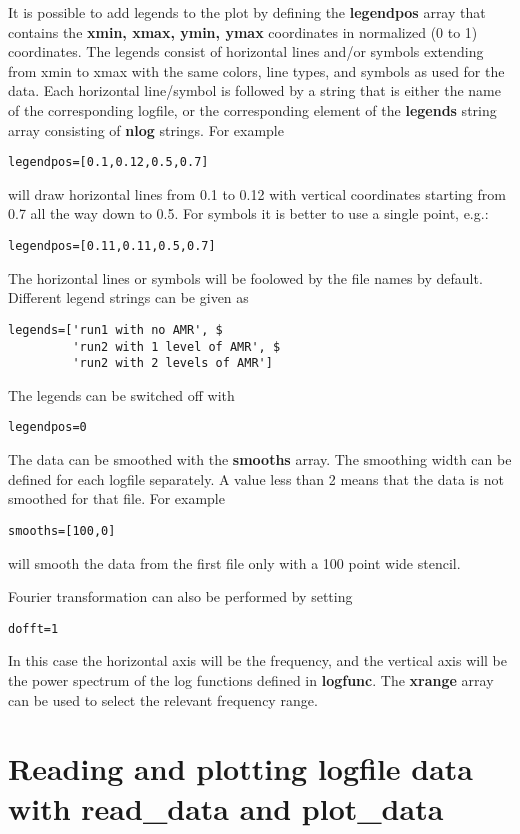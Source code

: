 \documentclass{article}
\begin{document}
It is possible to add legends to the plot by defining the {\bf legendpos}
array that contains the {\bf xmin, xmax, ymin, ymax} coordinates 
in normalized (0 to 1) coordinates. The legends consist of 
horizontal lines and/or symbols extending from xmin to xmax with the 
same colors, line types, and symbols as used for the data. 
Each horizontal line/symbol is followed by a string that is either
the name of the corresponding logfile, or the corresponding
element of the {\bf legends} string array consisting of {\bf nlog} strings.
For example
\begin{verbatim}
legendpos=[0.1,0.12,0.5,0.7]
\end{verbatim}
will draw horizontal lines from 0.1 to 0.12 with vertical coordinates
starting from 0.7 all the way down to 0.5. For symbols it is better
to use a single point, e.g.:
\begin{verbatim}
legendpos=[0.11,0.11,0.5,0.7]
\end{verbatim}
The horizontal lines or symbols will be foolowed by the file names by default.
Different legend strings can be given as
\begin{verbatim}
legends=['run1 with no AMR', $
         'run2 with 1 level of AMR', $
         'run2 with 2 levels of AMR']
\end{verbatim}
The legends can be switched off with 
\begin{verbatim}
legendpos=0
\end{verbatim}
The data can be smoothed with the {\bf smooths} array. 
The smoothing width can be defined for each logfile separately. 
A value less than 2 means that the data is not smoothed for that file.
For example
\begin{verbatim}
smooths=[100,0]
\end{verbatim}
will smooth the data from the first file only with a 100 point wide stencil.

Fourier transformation can also be performed by setting
\begin{verbatim}
dofft=1
\end{verbatim}
In this case the horizontal axis will be the frequency, and the
vertical axis will be the power spectrum of the log functions 
defined in {\bf logfunc}. The {\bf xrange} array 
can be used to select the relevant frequency range.

\section{Reading and plotting logfile data with read\_data and plot\_data}
\end{document}
